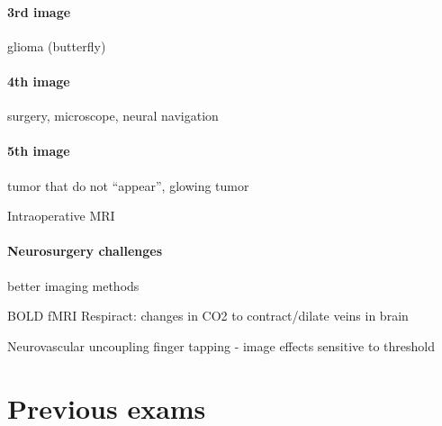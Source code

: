 \documentclass[12pt,article,oneside,a4paper]{memoir}
\begin{document}
\paragraph{3rd image} glioma (butterfly)
\paragraph{4th image} surgery, microscope, neural navigation
\paragraph{5th image} tumor that do not ``appear'', glowing tumor

Intraoperative MRI

\paragraph{Neurosurgery challenges} better imaging methods

BOLD fMRI
Respiract: changes in CO2 to contract/dilate veins in brain

Neurovascular uncoupling
finger tapping - image effects
sensitive to threshold


\newpage
\section{Previous exams}
\end{document}
